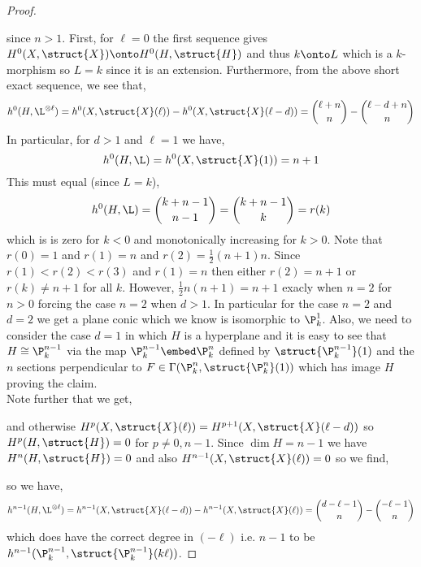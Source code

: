 \documentclass[12pt]{article}
\begin{document}
\begin{proof}
\begin{center}
\end{center}
since $n > 1$. First, for $\ell = 0$ the first sequence gives $H^0(X, \struct{X}) \onto H^0(H, \struct{H})$ and thus $k \onto L$ which is a $k$-morphism so $L = k$ since it is an extension. Furthermore, from the above short exact sequence, we see that,
\[ h^0(H, \L^{\otimes \ell}) = h^0(X, \struct{X}(\ell)) - h^0(X, \struct{X}(\ell - d)) = { \ell + n \choose n} - {\ell - d + n \choose n} \]
In particular, for $d > 1$ and $\ell = 1$ we have,
\[ h^0(H, \L) = h^0(X, \struct{X}(1)) = n + 1 \]
This must equal (since $L = k$),
\[ h^0(H, \L) = { k + n - 1 \choose n - 1} = { k + n - 1 \choose k} = r(k) \]
which is is zero for $k < 0$ and monotonically increasing for $k > 0$. Note that $r(0) = 1$ and $r(1) = n$ and $r(2) = \tfrac{1}{2}(n+1)n$. Since $r(1) < r(2) < r(3)$ and $r(1) = n$ then either $r(2) = n+1$ or $r(k) \neq n + 1$ for all $k$. However, $\tfrac{1}{2} n(n+1) = n + 1$ exacly when $n = 2$ for $n > 0$ forcing the case $n = 2$ when $d > 1$. In particular for the case $n = 2$ and $d = 2$ we get a plane conic which we know is isomorphic to $\P^1_k$. Also, we need to consider the case $d = 1$ in which $H$ is a hyperplane and it is easy to see that $H \cong \P^{n-1}_k$ via the map $\P^{n-1}_k \embed \P^n_k$ defined by $\struct{\P^{n-1}_k}(1)$ and the $n$ sections perpendicular to $F \in \Gamma(\P^n_k, \struct{\P^n_k}(1))$ which has image $H$ proving the claim.
\bigskip\\
Note further that we get,
\begin{center}
\end{center}
and otherwise $H^p(X, \struct{X}(\ell)) = H^{p+1}(X, \struct{X}(\ell - d))$ so $H^p(H, \struct{H}) = 0$ for $p \neq 0, n-1$. Since $\dim{H} = n-1$ we have $H^n(H, \struct{H}) = 0$ and also $H^{n-1}(X, \struct{X}(\ell)) = 0$ so we find,
\begin{center}
\end{center}
so we have,
\[ h^{n-1}(H, \L^{\otimes \ell}) = h^{n-1}(X, \struct{X}(\ell - d)) - h^{n-1}(X, \struct{X}(\ell)) = { d - \ell - 1 \choose n } - { - \ell - 1 \choose n} \]
which does have the correct degree in $(-\ell)$ i.e. $n-1$ to be $h^{n-1}(\P^{n-1}_k, \struct{\P^{n-1}_k}(k\ell))$.
\end{proof}
\end{document}
